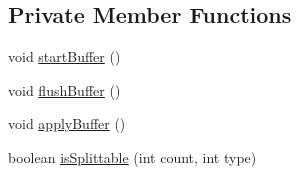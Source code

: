 \subsection*{Private Member Functions}
\begin{DoxyCompactItemize}
\item 
void \mbox{\hyperlink{classorg_1_1newdawn_1_1slick_1_1opengl_1_1renderer_1_1_v_a_o_g_l_renderer_aec6f5ba886a3a750c3cc27527e7b6b6e}{start\+Buffer}} ()
\item 
void \mbox{\hyperlink{classorg_1_1newdawn_1_1slick_1_1opengl_1_1renderer_1_1_v_a_o_g_l_renderer_ab3e5846e23cb9b7d4018e1ce45e2fea9}{flush\+Buffer}} ()
\item 
void \mbox{\hyperlink{classorg_1_1newdawn_1_1slick_1_1opengl_1_1renderer_1_1_v_a_o_g_l_renderer_a7c5d09419cd40761be8f849631aebab5}{apply\+Buffer}} ()
\item 
boolean \mbox{\hyperlink{classorg_1_1newdawn_1_1slick_1_1opengl_1_1renderer_1_1_v_a_o_g_l_renderer_a680c1bc366d8d8680355f4bae4f332f0}{is\+Splittable}} (int count, int type)
\end{DoxyCompactItemize}
